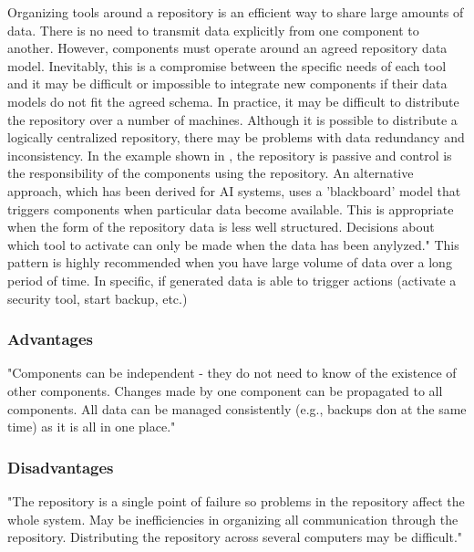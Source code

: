 Organizing tools around a repository is an efficient way to share large amounts of data. There is no need to transmit data explicitly from one component to another. However, components must operate around an agreed repository data model. Inevitably, this is a compromise between the specific needs of each tool and it may be difficult or impossible to integrate new components if their data models do not fit the agreed schema. In practice, it may be difficult to distribute the repository over a number of machines. Although it is possible to distribute a logically centralized repository, there may be problems with data redundancy and inconsistency.
In the example shown in , the repository is passive and control is the responsibility of the components using the repository. An alternative approach, which has been derived for AI systems, uses a 'blackboard' model that triggers components when particular data become available. This is appropriate when the form of the repository data is less well structured. Decisions about which tool to activate can only be made when the data has been anylyzed." \citep{sommerville}
\vfill
This pattern is highly recommended when you have large volume of data over a long period of time. In specific, if generated data is able to trigger actions (activate a security tool, start backup, etc.)
\pagebreak
\subsubsection{Advantages}
"Components can be independent - they do not need to know of the existence of other components. Changes made by one component can be propagated to all components. All data can be managed consistently (e.g., backups don at the same time) as it is all in one place."\citep{sommerville}
\subsubsection{Disadvantages}
"The repository is a single point of failure so problems in the repository affect the whole system. May be inefficiencies in organizing all communication through the repository. Distributing the repository across several computers may be difficult."\citep{sommerville}
